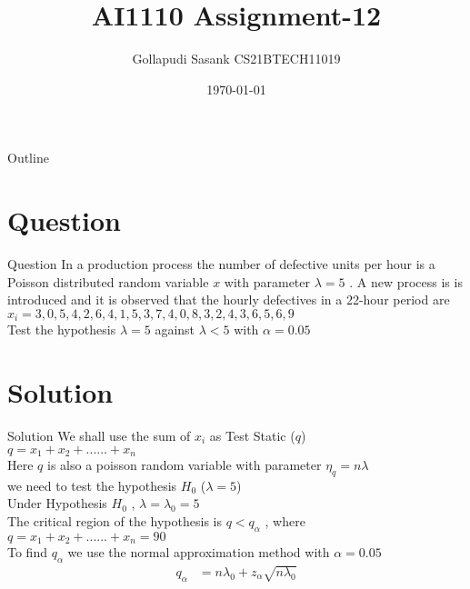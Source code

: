 \documentclass{beamer}
\title{AI1110 Assignment-12}
\author{Gollapudi Sasank CS21BTECH11019}
\date{\today}
\begin{document}
\begin{frame}
    \titlepage 
\end{frame}

\logo{}


\begin{frame}{Outline}
    \tableofcontents
\end{frame}


\section{Question}
\begin{frame}{Question}
In a production process the number of defective units per hour is a Poisson distributed random variable $x$ with parameter $\lambda = 5$ . A new process is is introduced and it is observed that the hourly defectives in a 22-hour period are \\
$x_i = 3,0,5,4,2,6,4,1,5,3,7,4,0,8,3,2,4,3,6,5,6,9$ \\
Test the hypothesis $ \lambda = 5 $ against $ \lambda < 5$ with $ \alpha = 0.05 $
\end{frame}

\section{Solution}
\begin{frame}{Solution}
We shall use the sum of $x_i$ as Test Static ($q$) \\
$ q = x_1 + x_2 + ...... + x_n$ \\
Here $q$ is also a poisson random variable with parameter $\eta_q = n\lambda$ \\
we need to test the hypothesis  $H_0$ ($ \lambda = 5 $) \\
Under Hypothesis $H_0$ , $\lambda = \lambda_0 = 5$ \\
The critical region of the hypothesis is $q<q_\alpha$ , where \\
$ q = x_1 + x_2 + ...... + x_n = 90$ \\
To find $q_\alpha$ we use the normal approximation method with $\alpha = 0.05$ \\
\begin{align}
q_\alpha &= n\lambda_0 + z_\alpha \sqrt{n\lambda_0} \\
\end{align}
\end{frame}
\end{document}
